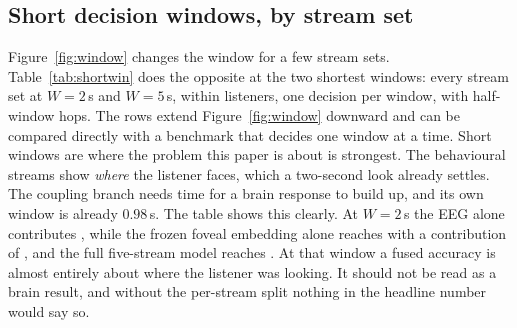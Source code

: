 \subsection{Short decision windows, by stream set}
\label{app:shortwin}

Figure~\ref{fig:window} changes the window for a few stream sets.
Table~\ref{tab:shortwin} does the opposite at the two shortest windows: every
stream set at $W=2$\,s and $W=5$\,s, within listeners, one decision per window,
with half-window hops. The rows extend Figure~\ref{fig:window} downward and can be
compared directly with a benchmark that decides one window at a time. Short
windows are where the problem this paper is about is strongest. The behavioural
streams show \emph{where} the listener faces, which a two-second look already
settles. The coupling branch needs time for a brain response to build up, and its
own window is already $0.98$\,s. The table shows this clearly. At $W=2$\,s the
EEG alone contributes , while the frozen foveal embedding
alone reaches  with a contribution of
, and the full five-stream model reaches
. At that window a fused accuracy is almost entirely about
where the listener was looking. It should not be read as a brain result, and
without the per-stream split nothing in the headline number would say so.

